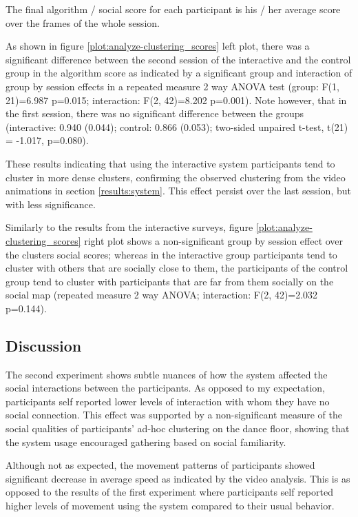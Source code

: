 \documentclass[a4paper,11pt]{article}
\begin{document}
{The final algorithm / social score for each participant is his / her average score over the frames of the whole session.

As shown in figure \ref{plot:analyze-clustering_scores} left plot, there was a significant difference between the second session of the interactive and the control group in the algorithm score as indicated by a significant group and interaction of group by session effects in a repeated measure 2 way ANOVA test (group: F(1, 21)=6.987 p=0.015; interaction: F(2, 42)=8.202 p=0.001).
Note however, that in the first session, there was no significant difference between the groups (interactive: 0.940 (0.044); control: 0.866 (0.053); two-sided unpaired t-test, t(21) = -1.017, p=0.080).

These results indicating that using the interactive system participants tend to cluster in more dense clusters, confirming the observed clustering from the video animations in section \ref{results:system}.
This effect persist over the last session, but with less significance.

Similarly to the results from the interactive surveys, figure \ref{plot:analyze-clustering_scores} right plot shows a non-significant group by session effect over the clusters social scores; whereas in the interactive group participants tend to cluster with others that are socially close to them, the participants of the control group tend to cluster with participants that are far from them socially on the social map (repeated measure 2 way ANOVA; interaction: F(2, 42)=2.032 p=0.144).

\subsection{Discussion}

The second experiment shows subtle nuances of how the system affected the social interactions between the participants.
As opposed to my expectation, participants self reported lower levels of interaction with whom they have no social connection.
This effect was supported by a non-significant measure of the social qualities of participants' ad-hoc clustering on the dance floor, showing that the system usage encouraged gathering based on social familiarity.

Although not as expected, the movement patterns of participants showed significant decrease in average speed as indicated by the video analysis.
This is as opposed to the results of the first experiment where participants self reported higher levels of movement using the system compared to their usual behavior.

}
\end{document}
